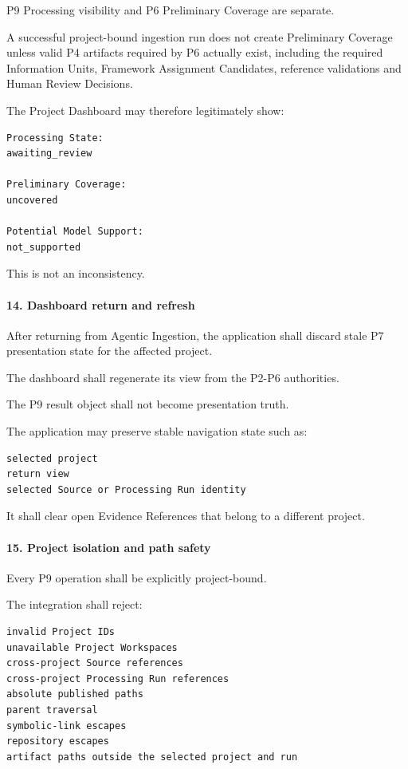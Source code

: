 P9 Processing visibility and P6 Preliminary Coverage are separate.

A successful project-bound ingestion run does not create Preliminary Coverage unless valid P4 artifacts required by P6 actually exist, including the required Information Units, Framework Assignment Candidates, reference validations and Human Review Decisions.

The Project Dashboard may therefore legitimately show:

\begin{verbatim}
Processing State:
awaiting_review

Preliminary Coverage:
uncovered

Potential Model Support:
not_supported
\end{verbatim}

This is not an inconsistency.

\hypertarget{14-dashboard-return-and-refresh}{%
\paragraph{14. Dashboard return and refresh}\label{14-dashboard-return-and-refresh}}

After returning from Agentic Ingestion, the application shall discard stale P7 presentation state for the affected project.

The dashboard shall regenerate its view from the P2-P6 authorities.

The P9 result object shall not become presentation truth.

The application may preserve stable navigation state such as:

\begin{verbatim}
selected project
return view
selected Source or Processing Run identity
\end{verbatim}

It shall clear open Evidence References that belong to a different project.

\hypertarget{15-project-isolation-and-path-safety}{%
\paragraph{15. Project isolation and path safety}\label{15-project-isolation-and-path-safety}}

Every P9 operation shall be explicitly project-bound.

The integration shall reject:

\begin{verbatim}
invalid Project IDs
unavailable Project Workspaces
cross-project Source references
cross-project Processing Run references
absolute published paths
parent traversal
symbolic-link escapes
repository escapes
artifact paths outside the selected project and run
\end{verbatim}

